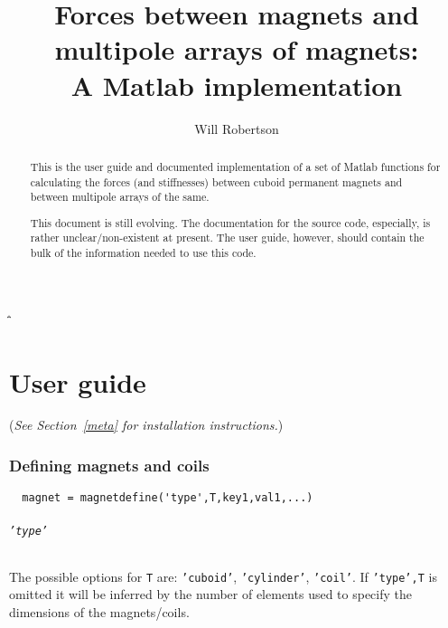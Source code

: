 \documentclass{article}
\begin{document}
\MakeShortVerb\|
\MakeShortVerb\"
\title{Forces between magnets and multipole arrays of magnets:\\ A Matlab implementation}
\author{Will Robertson}
\maketitle
\vfil
\begin{abstract}
This is the user guide and documented implementation of a set of
Matlab functions for calculating the forces (and stiffnesses) between
cuboid permanent magnets and between multipole arrays of the same.

This document is still evolving. The documentation for the source code,
especially, is rather unclear/non-existent at present. The user guide,
however, should contain the bulk of the information needed to use this code.
\end{abstract}

\tableofcontents

\newpage

\part{User guide}

(\emph{See Section~\ref{meta} for installation instructions.})

\section{Defining magnets and coils}

\begin{Verbatim}
  magnet = magnetdefine('type',T,key1,val1,...)
\end{Verbatim}

\paragraph{\texttt{'type'}}
The possible options for \texttt{T} are: \texttt{'cuboid'}, \texttt{'cylinder'}, \texttt{'coil'}.
If \texttt{'type',T} is omitted it will be inferred by the number of elements used to specify the dimensions of the magnets/coils.
\end{document}
